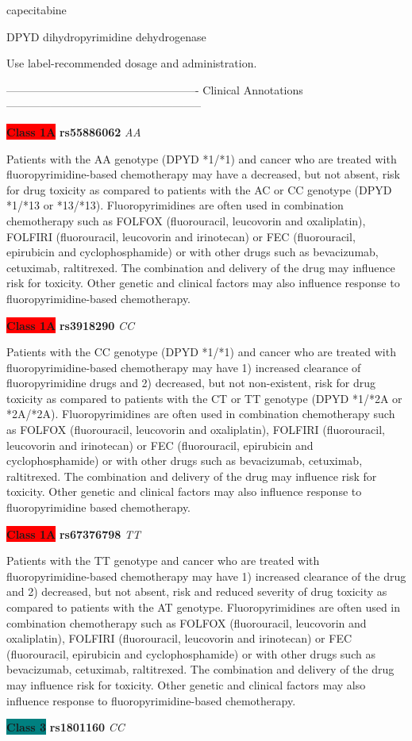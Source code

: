 \documentclass{resume} %
\begin{document}
\begin{rSection}{ capecitabine }
\begin{rSubsection}{ DPYD }{ dihydropyrimidine dehydrogenase }{}{}
\item[] Use label-recommended dosage and administration.
\item[] ---------------------------------------------------- Clinical Annotations -----------------------------------------------------\newline
\item \textbf{\colorbox{red} {Class 1A}} \textbf{ rs55886062 } \textit{ AA }
\item[] Patients with the AA genotype (DPYD *1/*1) and cancer who are treated with fluoropyrimidine-based chemotherapy may have a decreased, but not absent, risk for drug toxicity as compared to patients with the AC or CC genotype (DPYD *1/*13 or *13/*13). Fluoropyrimidines are often used in combination chemotherapy such as FOLFOX (fluorouracil, leucovorin and oxaliplatin), FOLFIRI (fluorouracil, leucovorin and irinotecan) or FEC (fluorouracil, epirubicin and cyclophosphamide) or with other drugs such as bevacizumab, cetuximab, raltitrexed. The combination and delivery of the drug may influence risk for toxicity. Other genetic and clinical factors may also influence response to fluoropyrimidine-based chemotherapy.\item \textbf{\colorbox{red} {Class 1A}} \textbf{ rs3918290 } \textit{ CC }
\item[] Patients with the CC genotype (DPYD *1/*1) and cancer who are treated with fluoropyrimidine-based chemotherapy may have 1) increased clearance of fluoropyrimidine drugs and 2) decreased, but not non-existent, risk for drug toxicity as compared to patients with the CT or TT genotype (DPYD *1/*2A or *2A/*2A). Fluoropyrimidines are often used in combination chemotherapy such as FOLFOX (fluorouracil, leucovorin and oxaliplatin), FOLFIRI (fluorouracil,  leucovorin and irinotecan) or FEC (fluorouracil, epirubicin and cyclophosphamide) or with other drugs such as bevacizumab, cetuximab, raltitrexed. The combination and delivery of the drug may influence risk for toxicity. Other genetic and clinical factors may also influence response to fluoropyrimidine based chemotherapy.\item \textbf{\colorbox{red} {Class 1A}} \textbf{ rs67376798 } \textit{ TT }
\item[] Patients with the TT genotype and cancer who are treated with fluoropyrimidine-based chemotherapy may have 1) increased clearance of the drug and 2) decreased, but not absent, risk and reduced severity of drug toxicity as compared to patients with the AT genotype. Fluoropyrimidines are often used in combination chemotherapy such as FOLFOX (fluorouracil, leucovorin and oxaliplatin), FOLFIRI (fluorouracil, leucovorin and irinotecan) or FEC (fluorouracil, epirubicin and cyclophosphamide) or with other drugs such as bevacizumab, cetuximab, raltitrexed. The combination and delivery of the drug may influence risk for toxicity. Other genetic and clinical factors may also influence response to fluoropyrimidine-based chemotherapy.\item \textbf{\colorbox{teal} {Class 3}} \textbf{ rs1801160 } \textit{ CC }

\end{rSubsection}
\end{rSection}
\end{document}
